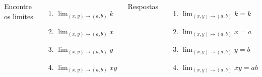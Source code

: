 \begin{question}
\begin{columns}[t]
  Encontre os limites
  \vspace{0.5\baselineskip}
  \begin{enumerate}
    \setlength\itemsep{1.5em}
    \item \(\lim_{(x, y)\to(a, b)} k\)
    \item \(\lim_{(x, y)\to(a, b)} x\)
    \item \(\lim_{(x, y)\to(a, b)} y\)
    \item \(\lim_{(x, y)\to(a, b)} xy\)
  \end{enumerate}
  \pause
  Respostas
  \pause
  \vspace{0.5\baselineskip}
  \begin{enumerate}[<+->]
    \setlength\itemsep{1.5em}
    \item \(\lim_{(x, y)\to(a, b)} k  = k  \)
    \item \(\lim_{(x, y)\to(a, b)} x  = a  \)
    \item \(\lim_{(x, y)\to(a, b)} y  = b  \)
    \item \(\lim_{(x, y)\to(a, b)} xy = ab \)
  \end{enumerate}
\end{columns}
\end{question}

